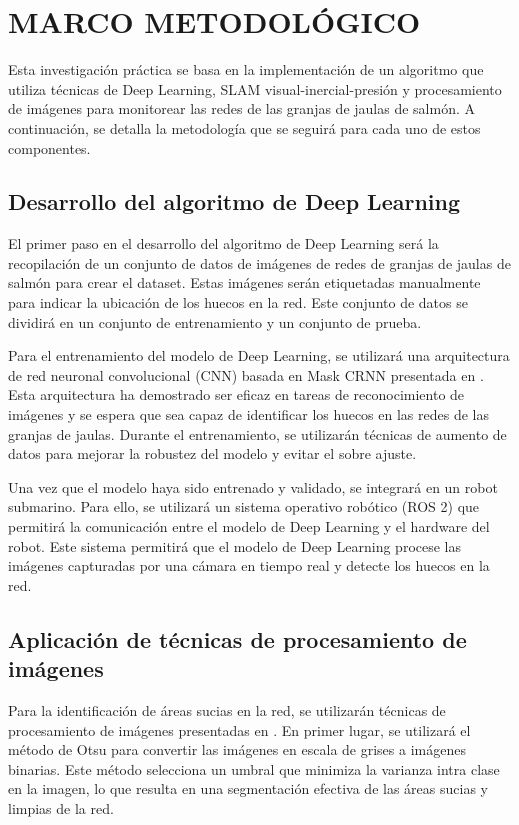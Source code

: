 \chapter{MARCO METODOLÓGICO} \label{MARCO_METODOLOGICO}

Esta investigación práctica se basa en la implementación de un algoritmo que utiliza técnicas de Deep Learning, SLAM visual-inercial-presión y procesamiento de imágenes para monitorear las redes de las granjas de jaulas de salmón. A continuación, se detalla la metodología que se seguirá para cada uno de estos componentes. 

\section{Desarrollo del algoritmo de Deep Learning}

El primer paso en el desarrollo del algoritmo de Deep Learning será la recopilación de un conjunto de datos de imágenes de redes de granjas de jaulas de salmón para crear el dataset. Estas imágenes serán etiquetadas manualmente para indicar la ubicación de los huecos en la red. Este conjunto de datos se dividirá en un conjunto de entrenamiento y un conjunto de prueba.

Para el entrenamiento del modelo de Deep Learning, se utilizará una arquitectura de red neuronal convolucional (CNN) basada en Mask CRNN presentada en \cite{cite:Zhang}. Esta arquitectura ha demostrado ser eficaz en tareas de reconocimiento de imágenes y se espera que sea capaz de identificar los huecos en las redes de las granjas de jaulas. Durante el entrenamiento, se utilizarán técnicas de aumento de datos para mejorar la robustez del modelo y evitar el sobre ajuste. 

Una vez que el modelo haya sido entrenado y validado, se integrará en un robot submarino. Para ello, se utilizará un sistema operativo robótico (ROS 2) que permitirá la comunicación entre el modelo de Deep Learning y el hardware del robot. Este sistema permitirá que el modelo de Deep Learning procese las imágenes capturadas por una cámara en tiempo real y detecte los huecos en la red.

\section{Aplicación de técnicas de procesamiento de imágenes}

Para la identificación de áreas sucias en la red, se utilizarán técnicas de procesamiento de imágenes presentadas en \cite{cite:Zhao}. En primer lugar, se utilizará el método de Otsu para convertir las imágenes en escala de grises a imágenes binarias. Este método selecciona un umbral que minimiza la varianza intra clase en la imagen, lo que resulta en una segmentación efectiva de las áreas sucias y limpias de la red.


